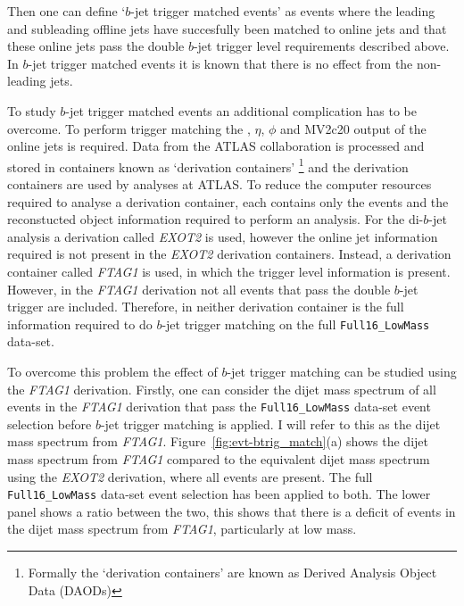 Then one can define `$b$-jet trigger matched events' as events where
the leading and subleading offline jets have succesfully been matched to online jets
and that these online jets pass the double $b$-jet trigger level requirements described above.
In $b$-jet trigger matched events it is known that there is no effect from the non-leading jets.

To study $b$-jet trigger matched events an additional complication has to be overcome.
To perform trigger matching the \pT, $\eta$, $\phi$ and MV2c20 output of the online jets is required.
Data from the ATLAS collaboration is processed and stored in containers known as `derivation containers'
\footnote{Formally the `derivation containers' are known as Derived Analysis Object Data (DAODs)}
and the derivation containers are used by analyses at ATLAS.
To reduce the computer resources required to analyse a derivation container,
each contains only the events and the reconstucted object information required to perform an analysis.
For the di-$b$-jet analysis a derivation called \textit{EXOT2} is used,
however the online jet information required is not present in the \textit{EXOT2} derivation containers.
Instead, a derivation container called \textit{FTAG1} is used, in which the trigger level information is present.
However, in the \textit{FTAG1} derivation not all events that pass the double $b$-jet trigger are included.
Therefore, in neither derivation container is the full information required to do $b$-jet trigger matching on the full \verb|Full16_LowMass| data-set.

To overcome this problem the effect of $b$-jet trigger matching can be studied using the \textit{FTAG1} derivation.
Firstly, one can consider the dijet mass spectrum of all events in the \textit{FTAG1} derivation
that pass the \verb|Full16_LowMass| data-set event selection before $b$-jet trigger matching is applied.
I will refer to this as the dijet mass spectrum from \textit{FTAG1}.
Figure~\ref{fig:evt-btrig_match}(a) shows the dijet mass spectrum from \textit{FTAG1}
compared to the equivalent dijet mass spectrum using the \textit{EXOT2} derivation, where all events are present.
The full \verb|Full16_LowMass| data-set event selection has been applied to both.
The lower panel shows a ratio between the two, this shows that there is a deficit of events
in the dijet mass spectrum from \textit{FTAG1}, particularly at low mass.

